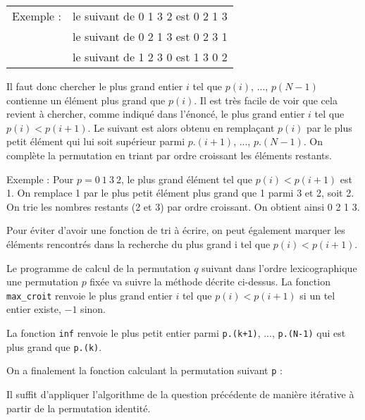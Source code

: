 \begin{tabular}{ l l }
    Exemple : & le suivant de 0 1 3 2 est 0 2 1 3 \\
     & le suivant de 0 2 1 3 est 0 2 3 1 \\
     & le suivant de 1 2 3 0 est 1 3 0 2
\end{tabular}
\medskip

Il faut donc chercher le plus grand entier $i$ tel que $p(i)$, ..., $p(N-1)$ contienne un élément plus grand que $p(i)$. Il est très facile de voir que cela revient à chercher, comme indiqué dans l'énoncé, le plus grand entier $i$ tel que $p(i)<p(i+1)$. Le suivant est alors obtenu en remplaçant $p(i)$ par le plus petit élément qui lui soit supérieur parmi $p.(i+1)$, ..., $p.(N-1)$. On complète la permutation en triant par ordre croissant les éléments restants.
\medskip

Exemple : Pour $p = 0~1~3~2$, le plus grand élément tel que $p(i)<p(i+1)$ est 1. On remplace 1 par le plus petit élément plus grand que 1 parmi 3 et 2, soit 2. On trie les nombres restants (2 et 3) par ordre croissant. On obtient ainsi 0 2 1 3.
\medskip

Pour éviter d'avoir une fonction de tri à écrire, on peut également marquer les éléments rencontrés dans la recherche du plus grand i tel que $p(i)<p(i+1)$.
\medskip

Le programme de calcul de la permutation $q$ suivant dans l'ordre lexicographique une permutation $p$ fixée va suivre la méthode décrite ci-dessus. La fonction \texttt{max\_croit} renvoie le plus grand entier $i$ tel que $p(i)<p(i+1)$ si un tel entier existe, $-1$ sinon.



La fonction \texttt{inf} renvoie le plus petit entier parmi \texttt{p.(k+1)}, ..., \texttt{p.(N-1)} qui est plus grand que \texttt{p.(k)}.



On a finalement la fonction calculant la permutation suivant \texttt{p} :



\Q
Il suffit d'appliquer l'algorithme de la question précédente de manière itérative à partir de la permutation identité.



\Fin
